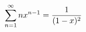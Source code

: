 \documentclass[preview]{standalone}
\begin{document}
\begin{align*}
\special{dvisvgm:raw <g id='unique000'>}\displaystyle\sum_{n=1}^{\infty}nx^{n-1}=\dfrac{1}{(1-x)^2}\special{dvisvgm:raw </g>}
\end{align*}
\end{document}
